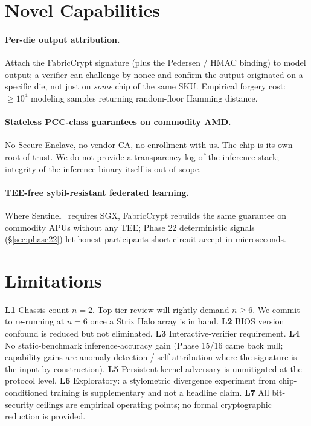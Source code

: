 \documentclass[11pt,letterpaper]{article}
\begin{document}
\section{Novel Capabilities}

\paragraph{Per-die output attribution.} Attach the FabricCrypt
signature (plus the Pedersen / HMAC binding) to model output; a
verifier can challenge by nonce and confirm the output originated on a
specific die, not just on \emph{some} chip of the same SKU. Empirical
forgery cost: $\geq 10^4$ modeling samples returning random-floor
Hamming distance.

\paragraph{Stateless PCC-class guarantees on commodity AMD.} No
Secure Enclave, no vendor CA, no enrollment with us. The chip is
its own root of trust. We do not provide a transparency log of the
inference stack; integrity of the inference binary itself is out of
scope.

\paragraph{TEE-free sybil-resistant federated learning.} Where
Sentinel~\cite{Sentinel2025} requires SGX, FabricCrypt rebuilds
the same guarantee on commodity APUs without any TEE; Phase 22
deterministic signals (\S\ref{sec:phase22}) let honest participants
short-circuit accept in microseconds.

\section{Limitations}
\label{sec:limits}

\textbf{L1} Chassis count $n=2$. Top-tier review will rightly demand
$n \geq 6$. We commit to re-running at $n=6$ once a Strix Halo array
is in hand. \textbf{L2} BIOS version confound is reduced but not
eliminated. \textbf{L3} Interactive-verifier requirement. \textbf{L4}
No static-benchmark inference-accuracy gain (Phase 15/16 came back
null; capability gains are anomaly-detection / self-attribution
where the signature is the input by construction). \textbf{L5}
Persistent kernel adversary is unmitigated at the protocol level.
\textbf{L6} Exploratory: a stylometric divergence experiment from
chip-conditioned training is supplementary and not a headline claim.
\textbf{L7} All bit-security ceilings are empirical operating points;
no formal cryptographic reduction is provided.
\end{document}
